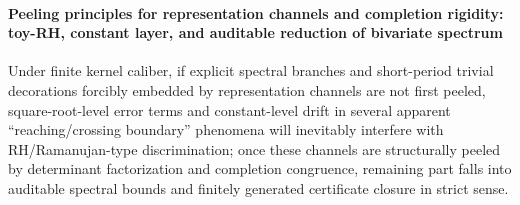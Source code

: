 \paragraph{Peeling principles for representation channels and completion rigidity: toy-RH, constant layer, and auditable reduction of bivariate spectrum}
Under finite kernel caliber, if explicit spectral branches and short-period trivial decorations forcibly embedded by representation channels are not first peeled, square-root-level error terms and constant-level drift in several apparent ``reaching/crossing boundary'' phenomena will inevitably interfere with RH/Ramanujan-type discrimination; once these channels are structurally peeled by determinant factorization and completion congruence, remaining part falls into auditable spectral bounds and finitely generated certificate closure in strict sense.
